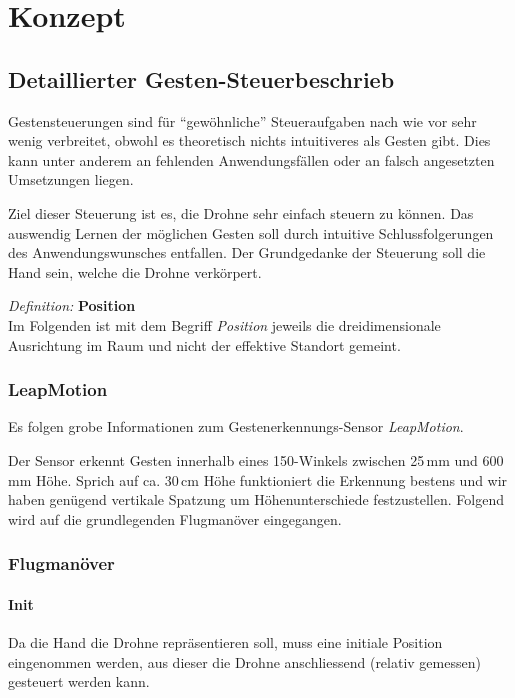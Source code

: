 \chapter{Konzept}

\section{Detaillierter Gesten-Steuerbeschrieb}

Gestensteuerungen sind für "`gewöhnliche"' Steueraufgaben nach wie vor sehr wenig verbreitet, obwohl es theoretisch nichts intuitiveres als Gesten gibt.
Dies kann unter anderem an fehlenden Anwendungsfällen oder an falsch angesetzten Umsetzungen liegen.

Ziel dieser Steuerung ist es, die Drohne sehr einfach steuern zu können.
Das auswendig Lernen der möglichen Gesten soll durch intuitive Schlussfolgerungen des Anwendungswunsches entfallen.
Der Grundgedanke der Steuerung soll die Hand sein, welche die Drohne verkörpert.

\begin{framed}
\textit{Definition: }\textbf{Position}\\
Im Folgenden ist mit dem Begriff \textit{Position} jeweils die dreidimensionale Ausrichtung im Raum und nicht der effektive Standort gemeint.
\end{framed}

\subsection{LeapMotion}
Es folgen grobe Informationen zum Gestenerkennungs-Sensor \textit{LeapMotion}.

Der Sensor erkennt Gesten innerhalb eines 150\textdegree-Winkels zwischen 25\,mm und 600\,mm Höhe.
Sprich auf ca. 30\,cm Höhe funktioniert die Erkennung bestens und wir haben genügend vertikale Spatzung um Höhenunterschiede festzustellen.
Folgend wird auf die grundlegenden Flugmanöver eingegangen.


\subsection{Flugmanöver}

\subsubsection{Init}

Da die Hand die Drohne repräsentieren soll, muss eine initiale Position eingenommen werden, aus dieser die Drohne anschliessend (relativ gemessen) gesteuert werden kann.

